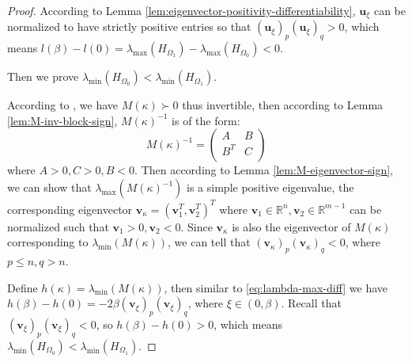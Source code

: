 \documentclass{article}
\theoremstyle{plain}
\theoremstyle{definition}
\theoremstyle{remark}
\begin{document}
\begin{proof}
According to Lemma \ref{lem:eigenvector-positivity-differentiability},
$\mathbf{u}_{\xi}$ can be normalized to have strictly positive entries
so that $(\mathbf{u}_{\xi})_p(\mathbf{u}_{\xi})_q > 0$,
which means $l(\beta) - l(0) = \lambda_{\max}(H_{\Omega_1}) - \lambda_{\max}(H_{\Omega_0}) < 0$.

Then we prove $\lambda_{\min}(H_{\Omega_0}) < \lambda_{\min}(H_{\Omega_1})$.

According to \citet{tang2024safe}, we have $M(\kappa) \succ 0$ thus invertible,
then according to Lemma \ref{lem:M-inv-block-sign}, $M(\kappa)^{-1}$ is of the form:
\[
M(\kappa)^{-1} = \begin{pmatrix}
    A & B \\
    B^T & C \\
\end{pmatrix}
\]
where $A > 0, C > 0, B < 0$. Then according to Lemma \ref{lem:M-eigenvector-sign}, we can show that $\lambda_{\max}(M(\kappa)^{-1})$ is a simple positive eigenvalue, the corresponding eigenvector $\mathbf{v}_{\kappa} = (\mathbf{v}_1^T, \mathbf{v}_2^T)^T$ where $\mathbf{v}_1 \in \mathbb{R}^{n}, \mathbf{v}_2 \in \mathbb{R}^{m-1}$ can be normalized such that $\mathbf{v}_1 > 0, \mathbf{v}_2 < 0$. Since $\mathbf{v}_{\kappa}$ is also the eigenvector of $M(\kappa)$ corresponding to $\lambda_{\min}(M(\kappa))$, we can tell that $(\mathbf{v}_{\kappa})_p (\mathbf{v}_{\kappa})_q < 0$, where $p \leq n, q > n$.

Define $h(\kappa) = \lambda_{\min}(M(\kappa))$,
then similar to \eqref{eq:lambda-max-diff} we have
$h(\beta) - h(0) = -2 \beta (\mathbf{v}_{\xi})_p (\mathbf{v}_{\xi})_q$,
where $\xi \in (0, \beta)$.
Recall that $(\mathbf{v}_{\xi})_p (\mathbf{v}_{\xi})_q < 0$,
so $h(\beta) - h(0) > 0$, which means $\lambda_{\min}(H_{\Omega_0}) < \lambda_{\min}(H_{\Omega_1})$.
\end{proof}
\end{document}

